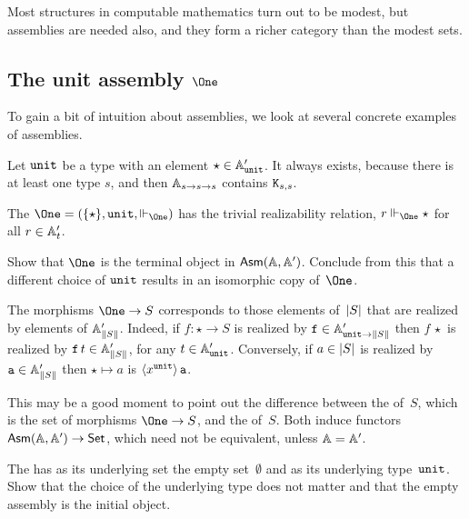 Most structures in computable mathematics turn out to be modest, but assemblies are needed also, and they form a richer category than the modest sets.

\subsection{The unit assembly $\One$}
\label{sec:asm-unit}

To gain a bit of intuition about assemblies, we look at several concrete examples of assemblies.

Let $\unit$ be a type with an element $\ttunit \in \subAtyp{\unit}$.
It always exists, because there is at least one type $s$, and then
$\Atyp{s \to s \to s}$ contains $\combK_{s,s}$.

The  $\One = (\set{\star}, \unit, {\rz[\One]})$ has the trivial realizability relation, $r \rz[\One] \star$ for all $r \in \subAtyp{t}$.

\begin{exercise}
  Show that $\One$ is the terminal object
  in $\AsmA$. Conclude from this that a different choice of $\unit$ results in an isomorphic copy of~$\One$.
\end{exercise}

The morphisms $\One \to S$ corresponds to those elements of~$\S{S}$ that are realized by elements of $\subAtyp{\T{S}}$. Indeed, if $f : \star \to S$ is realized by $\R{f} \in \subAtyp{\unit \to \T{S}}$ then $f \, \star$ is realized by $\R{f} \, t \in \subAtyp{\T{S}}$, for any $t \in \subAtyp{\unit}$. Conversely, if $a \in \S{S}$ is realized by $\R{a} \in \subAtyp{\T{S}}$ then $\star \mapsto a$ is $\tpcalam{x}{\unit}{\R{a}}$.

This may be a good moment to point out the difference between the  of~$S$, which is the set of morphisms $\One \to S$, and the  of~$S$. Both induce functors $\AsmA \to \Set$, which need not be equivalent, unless $\AA = \subAA$.

\begin{exercise}
  The  has as its underlying set the empty set~$\emptyset$ and as its underlying type~$\unit$. Show that the choice of the underlying type does not matter and that the empty assembly is the initial object.
\end{exercise}


